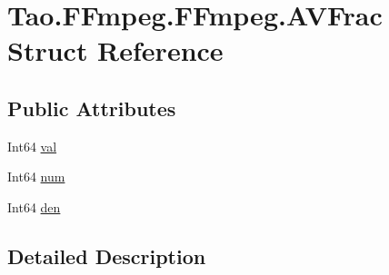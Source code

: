 \hypertarget{struct_tao_1_1_f_fmpeg_1_1_f_fmpeg_1_1_a_v_frac}{
\section{Tao.FFmpeg.FFmpeg.AVFrac Struct Reference}
\label{struct_tao_1_1_f_fmpeg_1_1_f_fmpeg_1_1_a_v_frac}
}
\subsection*{Public Attributes}
\begin{DoxyCompactItemize}
\item 
Int64 \hyperlink{struct_tao_1_1_f_fmpeg_1_1_f_fmpeg_1_1_a_v_frac_a87e1c14a7b7bab6702d8909ec6bb9850}{val}
\item 
Int64 \hyperlink{struct_tao_1_1_f_fmpeg_1_1_f_fmpeg_1_1_a_v_frac_a6810cb3b736ccdc4fdcd2a04b5359253}{num}
\item 
Int64 \hyperlink{struct_tao_1_1_f_fmpeg_1_1_f_fmpeg_1_1_a_v_frac_a663e72805fbb3ea5ba506535dcf5f497}{den}
\end{DoxyCompactItemize}


\subsection{Detailed Description}


